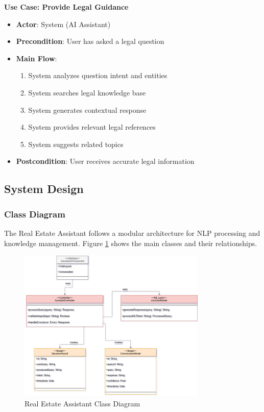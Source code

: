 \textbf{Use Case: Provide Legal Guidance}
\begin{itemize}
    \item \textbf{Actor}: System (AI Assistant)
    \item \textbf{Precondition}: User has asked a legal question
    \item \textbf{Main Flow}: 
    \begin{enumerate}
        \item System analyzes question intent and entities
        \item System searches legal knowledge base
        \item System generates contextual response
        \item System provides relevant legal references
        \item System suggests related topics
    \end{enumerate}
    \item \textbf{Postcondition}: User receives accurate legal information
\end{itemize}

\subsection{System Design}
\subsubsection{Class Diagram}
The Real Estate Assistant follows a modular architecture for NLP processing and knowledge management. Figure \ref{fig:assistant-class-diagram} shows the main classes and their relationships.

\begin{figure}[htbp]
    \centering
    \includegraphics[width=0.8\textwidth]{images/assistant_class_diagram.png}
    \caption{Real Estate Assistant Class Diagram}
    \label{fig:assistant-class-diagram}
\end{figure}

